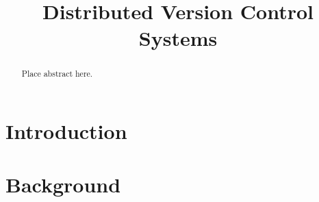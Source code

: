 \documentclass{article}
\title{Distributed Version Control Systems}
\begin{document}
\maketitle

\begin{abstract}
 Place abstract here.
\end{abstract}


\section{Introduction}

\section{Background}
%
%
%
\end{document}
